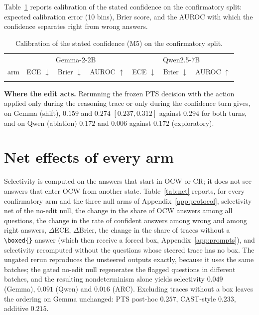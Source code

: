\documentclass{article}
\newcommand{\ocw}{OCW}
\newcommand{\crok}{CR}
\begin{document}
Table~\ref{tab:calibration} reports calibration of the stated confidence on
the confirmatory split: expected calibration error (10 bins), Brier score, and
the AUROC with which the confidence separates right from wrong answers.

\begin{table}[h]\footnotesize\setlength{\tabcolsep}{4pt}
\centering
\begin{tabular}{l|ccc|ccc}
\hline
 & \multicolumn{3}{c|}{Gemma-2-2B} & \multicolumn{3}{c}{Qwen2.5-7B} \\
arm & ECE $\downarrow$ & Brier $\downarrow$ & AUROC $\uparrow$ & ECE $\downarrow$ & Brier $\downarrow$ & AUROC $\uparrow$ \\
\hline
{}{gen/calibration}
\hline
\end{tabular}
\caption{Calibration of the stated confidence (M5) on the confirmatory split.}
\label{tab:calibration}
\end{table}

\textbf{Where the edit acts.} Rerunning the frozen PTS decision with the action
applied only during the reasoning trace or only during the confidence turn
gives, on Gemma (shift), $0.159$ and $0.274$ $[0.237, 0.312]$ against $0.294$
for both turns, and on Qwen (ablation) $0.172$ and $0.006$ against $0.172$
(exploratory).

\section{Net effects of every arm}
\label{app:net}

Selectivity is computed on the answers that start in \ocw{} or \crok{}; it does
not see answers that enter \ocw{} from another state. Table~\ref{tab:net}
reports, for every confirmatory arm and the three null arms of
Appendix~\ref{app:protocol}, selectivity net of the no-edit null, the change in
the share of \ocw{} answers among all questions, the change in the rate of
confident answers among wrong and among right answers, $\Delta$ECE,
$\Delta$Brier, the change in the share of traces without a \verb|\boxed{}|
answer (which then receive a forced box, Appendix~\ref{app:prompts}), and
selectivity recomputed without the questions whose steered trace has no box.
The ungated rerun reproduces the unsteered outputs exactly, because it uses the
same batches; the gated no-edit null regenerates the flagged questions in
different batches, and the resulting nondeterminism alone yields selectivity
$0.049$ (Gemma), $0.091$ (Qwen) and $0.016$ (ARC). Excluding traces without a
box leaves the ordering on Gemma unchanged: PTS post-hoc $0.257$, CAST-style
$0.233$, additive $0.215$.
\end{document}
